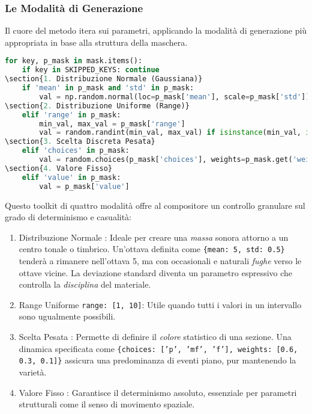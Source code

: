 \subsubsection{Le Modalità di Generazione}
Il cuore del metodo itera sui parametri, applicando la modalità di generazione più appropriata in base alla struttura della maschera.

\begin{lstlisting}[language=Python]
for key, p_mask in mask.items():
    if key in SKIPPED_KEYS: continue
\section{1. Distribuzione Normale (Gaussiana)}
    if 'mean' in p_mask and 'std' in p_mask:
        val = np.random.normal(loc=p_mask['mean'], scale=p_mask['std'])
\section{2. Distribuzione Uniforme (Range)}
    elif 'range' in p_mask:
        min_val, max_val = p_mask['range']
        val = random.randint(min_val, max_val) if isinstance(min_val, int) else random.uniform(min_val, max_val)
\section{3. Scelta Discreta Pesata}
    elif 'choices' in p_mask:
        val = random.choices(p_mask['choices'], weights=p_mask.get('weights'), k=1)[0]
\section{4. Valore Fisso}
    elif 'value' in p_mask:
        val = p_mask['value']
\end{lstlisting}

Questo toolkit di quattro modalità offre al compositore un controllo granulare sul grado di determinismo e casualità:

\begin{enumerate}
    \item Distribuzione Normale : Ideale per creare una \textit{massa} sonora attorno a un centro tonale o timbrico. Un'ottava definita come \texttt{\{mean: 5, std: 0.5\}} tenderà a rimanere nell'ottava 5, ma con occasionali e naturali \textit{fughe} verso le ottave vicine. La deviazione standard diventa un parametro espressivo che controlla la \textit{disciplina} del materiale.
    \item Range Uniforme \texttt{range: [1, 10]}: Utile quando tutti i valori in un intervallo sono ugualmente possibili.
    \item Scelta Pesata : Permette di definire il \textit{colore} statistico di una sezione. Una dinamica specificata come \texttt{\{choices: ['p', 'mf', 'f'], weights: [0.6, 0.3, 0.1]\}} assicura una predominanza di eventi piano, pur mantenendo la varietà.
    \item Valore Fisso : Garantisce il determinismo assoluto, essenziale per parametri strutturali come il senso di movimento spaziale.
\end{enumerate}
